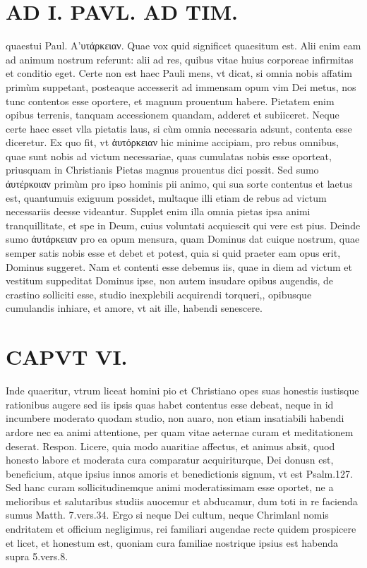 \documentclass{article}
\begin{document}
\begin{pages}
\section*{AD I. PAVL. AD TIM. }
\marginpar{[ p.434 ]}\pstart quaestui Paul. Α’υτάρκειαν. Quae vox quid significet quaesitum est. Alii enim eam ad animum nostrum referunt: alii ad res, quibus vitae huius corporeae infirmitas et conditio eget. Certe non est haec Pauli mens, vt dicat, si omnia nobis affatim primùm suppetant, posteaque accesserit ad immensam opum vim Dei metus, nos tunc contentos esse oportere, et magnum prouentum habere.  \pend\pstart Pietatem enim opibus terrenis, tanquam accessionem quandam, adderet et subiiceret. Neque certe haec esset vlla pietatis laus, si cùm omnia necessaria adsunt, contenta esse diceretur. Ex quo fit, vt ἀυτόρκειαν hic minime accipiam, pro rebus omnibus, quae sunt nobis ad victum necessariae, quas cumulatas nobis esse oporteat, priusquam in Christianis Pietas magnus prouentus dici possit. Sed sumo ἀυτέρκοιαν primùm pro ipso hominis pii animo, qui sua sorte contentus et laetus est, quantumuis exiguum possidet, multaque illi etiam de rebus ad victum necessariis deesse videantur. Supplet enim illa omnia pietas ipsa animi tranquillitate, et spe in Deum, cuius voluntati acquiescit qui vere est pius. Deinde sumo ἀυτάρκειαν pro ea opum mensura, quam Dominus dat cuique nostrum, quae semper satis nobis esse et debet et potest, quia si quid praeter eam opus erit, Dominus suggeret. Nam et contenti esse debemus iis, quae in diem ad victum et vestitum suppeditat Dominus ipse, non autem insudare opibus augendis, de crastino solliciti esse, studio inexplebili acquirendi torqueri,, opibusque cumulandis inhiare, et amore, vt ait ille, habendi senescere.  \pend
\section*{CAPVT  VI. }
\marginpar{[ p.435 ]}\pstart Inde quaeritur, vtrum liceat homini pio et Christiano opes suas honestis iustisque rationibus augere sed iis ipsis quas habet contentus esse debeat, neque in id incumbere moderato quodam studio, non auaro, non etiam insatiabili habendi ardore nec ea animi attentione, per quam vitae aeternae curam et meditationem deserat. Respon. Licere, quia modo auaritiae affectus, et animus absit, quod honesto labore et moderata cura comparatur acquiriturque, Dei donusn est, beneficium, atque ipsius innos amoris et benedictionis signum, vt est Psalm.127. Sed hanc curam sollicitudinemque animi moderatissimam esse oportet, ne a melioribus et salutaribus studiis auocemur et abducamur, dum toti in re facienda sumus Matth. 7.vers.34. Ergo si neque Dei cultum, neque Chrimlanl nomis endritatem et officium negligimus, rei familiari augendae recte quidem prospicere et licet, et honestum est, quoniam cura familiae nostrique ipsius est habenda supra 5.vers.8.  \pend
{}
{}

\end{pages}
\end{document}
